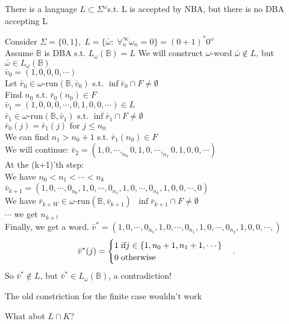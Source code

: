 \nt
{
    There is a language $L \subset \Sigma^{\omega} $s.t. L is accepted by NBA, but there is no DBA accepting L
   \begin{myproof}
       Consider $\Sigma = \{0,1\},\; L = \{ \bar{\omega}:\; \forall^{\infty}_n \omega_n=0\} = (0+1)^{*}0^{\omega} $\\
       Assume $\mathbb{B}$ is DBA s.t. $L_{\omega}(\mathbb{B}) = L$
       We will construct $\omega\text{-word }\bar{\omega} \not \in L$, but $\bar{\omega} \in L_{\omega}(\mathbb{B})$ \\
       $\bar{v}_0 = (1,0,0,0,\cdots )$\\
       Let $\bar{r}_0 \in \omega\text{-run}(\mathbb{B},\bar{v}_0)$ s.t. $\inf{\bar{r}_0} \cap F \neq \emptyset$\\
       Find $n_0$ s.t. $\bar{r}_0(n_0) \in F$\\
       $\bar{v}_1 = (1,0,0,0,\cdots ,0,1,0,0,\cdots ) \in L$\\
       $\bar{r}_1 \in \omega\text{-run}(\mathbb{B},\bar{v}_1)$ s.t. $\inf{\bar{r}_1}\cap F \neq \emptyset$\\
       $\bar{r}_0(j) = \bar{r}_1(j) \text{ for }j\leq n_0$\\
       We can find $n_1 > n_0+1$ s.t. $\bar{r}_1(n_0)\in F$\\
       We will continue:
       $\bar{v}_2 = (1,0,\cdots,_{n_0} 0,1,0,\cdots ,_{n_1}0,1,0,0,\cdots )$ \\
       At the (k+1)'th step:\\
       We have $n_0 < n_1 < \cdots < n_k$ \\
       $\bar{v}_{k+1} = (1,0,\cdots,0_{n_0} ,1,0,\cdots ,0_{n_1},1,0,\cdots,0_{n_k},1,0,0,\cdots ,0 )$ \\
       We have $\bar{r}_{k+W} \in \omega\text{-run}( \mathbb{B},\bar{v}_{k+1})\;\; \inf{\bar{r}_{k+1}}\cap F \neq \emptyset$\\
       $\cdots $ we get $n_{k+!}$\\
       Finally, we get a word.
       $\bar{v}^{*} = (1,0,\cdots,0_{n_0} ,1,0,\cdots ,0_{n_1},1,0,\cdots,0_{n_2},1,0,0,\cdots , )$ \\
      \[
          \bar{v}^{*}(j) = \begin{cases}1\; \text{if} j\in \{ 1,n_0+1,n_1+1,\cdots \}\\
                            0\; \text{otherwise}
                            \end{cases}\\
      .\]  
      So $\bar{v}^{*}\not \in L$, but $\bar{v}^{*} \in L_{\omega}(\mathbb{B})$, a contradiction!

   \end{myproof}
   The old constriction for the finite case wouldn't work
}
What abot $L\cap K$?

